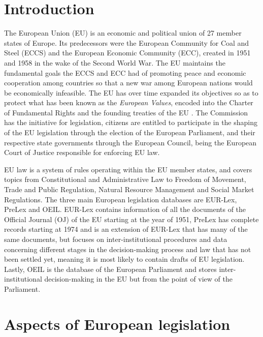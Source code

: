 \documentclass[sigconf, authorversion]{acmart}
\begin{document}

\maketitle

\section{Introduction}
\label{intro}
The European Union (EU) is an economic and political union of 27 member states of Europe. Its predecessors were the European Community for Coal and Steel (ECCS) and the European Economic Community (ECC), created in 1951 and 1958 in the wake of the Second World War. The EU maintains the fundamental goals the ECCS and ECC had of promoting peace and economic cooperation among countries so that a new war among European nations would be economically infeasible. The EU has over time expanded its objectives so as to protect what has been known as the \textit{European Values}, encoded into the Charter of Fundamental Rights \cite{cfr} and the founding treaties of the EU \cite{teu, tfeu}.
The Commission has the initiative for legislation, citizens are entitled to participate in the shaping of the EU legislation through the election of the European Parliament, and their respective state governments through the European Council, being the European Court of Justice responsible for enforcing EU law.

EU law is a system of rules operating within the EU member states, and covers topics from Constitutional and Administrative Law to Freedom of Movement, Trade and Public Regulation, Natural Resource Management and Social Market Regulations.
The three main European legislation databases are EUR-Lex, PreLex and OEIL. EUR-Lex contains information of all the documents of the Official Journal (OJ) of the EU starting at the year of 1951, PreLex has complete records starting at 1974 and is an extension of EUR-Lex that has many of the same documents, but focuses on inter-institutional procedures and data concerning different stages in the decision-making process and law that has not been settled yet, meaning it is most likely to contain drafts of EU legislation. Lastly, OEIL is the database of the European Parliament and stores inter-institutional decision-making in the EU but from the point of view of the Parliament.

\section{Aspects of European legislation}
\end{document}
